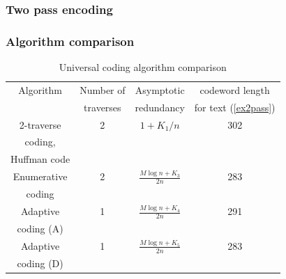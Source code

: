 \documentclass[14pt]{beamer}
\begin{document}
\begin{frame}
\frametitle{Two pass encoding}
\begin{itemize}    
    
\end{itemize}
\end{frame}




\begin{frame}
\frametitle{Algorithm comparison}
\begin{itemize}    
    
\footnotesize {
 
    \begin{table}[htbp]
    \caption{Universal coding algorithm comparison}
    \begin{center}
    \begin{tabular}
    {|c|c|c|c|}  \hline %
    Algorithm & Number of  & Asymptotic &   codeword length  \\ %
              & traverses  & redundancy &   for text (\ref{ex2pass})    \\%
    \hline %
    2-traverse  & 2& $1 + K_1 / n$& 302 \\%
    coding, &  &  &  \\ %
    Huffman code &  &  &  \\ \hline%
    Enumerative & 2& $\frac{M\log n + K_3 }{2n}$& 283 \\ %
    coding      &  &  &  \\\hline %
     Adaptive & 1& $\frac{M\log n + K_4 }{2n}$& 291 \\%
     coding (A) &  &  &   \\\hline %
    Adaptive  & 1& $\frac{M\log n + K_5 }{2n}$&283 \\%
    coding (D) &  &  &  \\\hline
    \end{tabular}
    \label{tab3_6} \end{center}
    \end{table}
}    
    
\end{itemize}
\end{frame}

\end{document}
